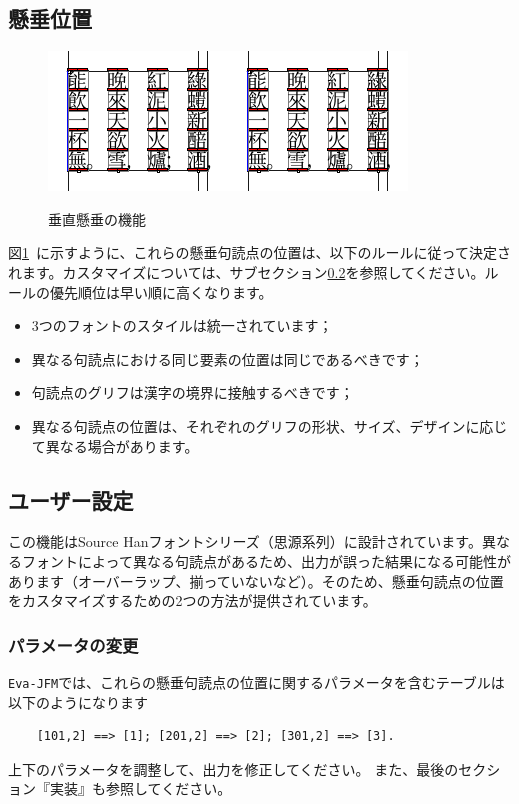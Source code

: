 \documentclass[twoside]{ltjsarticle}
\def\空{\quad}
\begin{document}
\subsection{懸垂位置}
\begin{figure}[htb]
    \centering
    \includegraphics[height = 12\zh]{figure/fig-tc.pdf}\空\includegraphics[height = 12\zh]{figure/fig-jp.pdf}
    \caption{垂直懸垂の機能}
    \label{fig:lgp}
\end{figure}
図\ref{fig:lgp}~に示すように、これらの懸垂句読点の位置は、以下のルールに従って決定されます。カスタマイズについては、サブセクション\ref{sec:config}を参照してください。ルールの優先順位は早い順に高くなります。
\begin{itemize}
    \item 3つのフォントのスタイルは統一されています；
    \item 異なる句読点における同じ要素の位置は同じであるべきです；
    \item 句読点のグリフは漢字の境界に接触するべきです；
    \item 異なる句読点の位置は、それぞれのグリフの形状、サイズ、デザインに応じて異なる場合があります。
\end{itemize}

\subsection{ユーザー設定}
\label{sec:config}
この機能はSource Hanフォントシリーズ（思源系列）に設計されています。異なるフォントによって異なる句読点があるため、出力が誤った結果になる可能性があります（オーバーラップ、揃っていないなど）。そのため、懸垂句読点の位置をカスタマイズするための2つの方法が提供されています。

\subsubsection{パラメータの変更}
\texttt{Eva-JFM}では、これらの懸垂句読点の位置に関するパラメータを含むテーブルは以下のようになります
\begin{lstlisting}
    [101,2] ==> [1]; [201,2] ==> [2]; [301,2] ==> [3].
\end{lstlisting}
上下のパラメータを調整して、出力を修正してください。
また、最後のセクション『実装』も参照してください。
\end{document}
